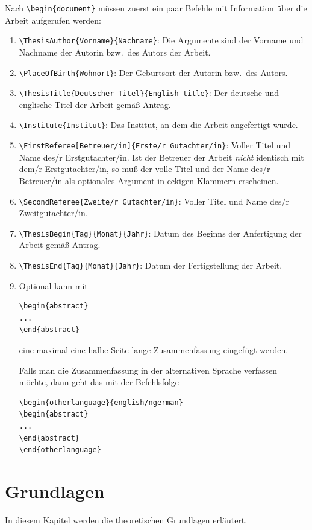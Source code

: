 \documentclass[bachelor,       %
               twoside,        %
               BCOR10mm,       %
               ngerman,english  %
               ]{GAUBM}
\begin{document}
Nach \verb!\begin{document}! m{\"u}ssen zuerst ein paar Befehle mit
Information {\"u}ber die Arbeit aufgerufen werden:
\begin{enumerate}
\item \verb!\ThesisAuthor{Vorname}{Nachname}!: Die Argumente sind der
Vorname und Nachname der Autorin bzw.\ des Autors der Arbeit.
\item \verb!\PlaceOfBirth{Wohnort}!: Der Geburtsort der Autorin bzw.\ des Autors.
\item \verb!\ThesisTitle{Deutscher Titel}{English title}!: Der deutsche und englische Titel der Arbeit gem{\"a}{\ss} Antrag.
\item \verb!\Institute{Institut}!: Das Institut, an dem die Arbeit angefertigt wurde.
\item \verb!\FirstReferee[Betreuer/in]{Erste/r Gutachter/in}!: Voller Titel
und Name des/r Erstgutachter/in. Ist der Betreuer der Arbeit \emph{nicht}
identisch mit dem/r Erstgutachter/in, so mu{\ss} der volle Titel und der Name
des/r Betreuer/in als optionales Argument in eckigen Klammern erscheinen.
\item \verb!\SecondReferee{Zweite/r Gutachter/in}!: Voller Titel
und Name des/r Zweitgutachter/in.
\item \verb!\ThesisBegin{Tag}{Monat}{Jahr}!: Datum des Beginns der Anfertigung
der Arbeit gem{\"a}{\ss} Antrag.
\item \verb!\ThesisEnd{Tag}{Monat}{Jahr}!: Datum der Fertigstellung der Arbeit.
\item Optional kann mit
\begin{verbatim} 
\begin{abstract}
...
\end{abstract}
\end{verbatim}
eine maximal eine halbe Seite lange Zusammenfassung eingef{\"u}gt werden.

Falls man die Zusammenfassung in der alternativen Sprache verfassen m{\"o}chte,
dann geht das mit der Befehlsfolge
\begin{verbatim} 
\begin{otherlanguage}{english/ngerman}
\begin{abstract}
...
\end{abstract}
\end{otherlanguage}
\end{verbatim}
\end{enumerate}

\chapter{Grundlagen}
In diesem Kapitel werden die theoretischen Grundlagen erl{\"a}utert.
\end{document}
